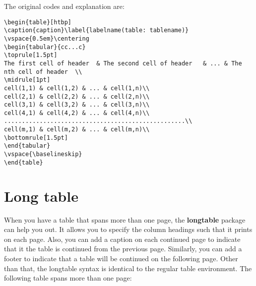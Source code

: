 The original codes and explanation are:

\begin{lstlisting}[language={[LaTex]Tex}]
\begin{table}[htbp]
\caption{caption}\label{labelname(table: tablename)}
\vspace{0.5em}\centering
\begin{tabular}{cc...c}
\toprule[1.5pt]
The first cell of header  & The second cell of header   & ... & The nth cell of header  \\
\midrule[1pt]
cell(1,1) & cell(1,2) & ... & cell(1,n)\\
cell(2,1) & cell(2,2) & ... & cell(2,n)\\
cell(3,1) & cell(3,2) & ... & cell(3,n)\\
cell(4,1) & cell(4,2) & ... & cell(4,n)\\
...................................................\\
cell(m,1) & cell(m,2) & ... & cell(m,n)\\
\bottomrule[1.5pt]
\end{tabular}
\vspace{\baselineskip}
\end{table}
\end{lstlisting}

\section{Long table}
When you have a table that spans more than one page, the \textbf{longtable} package can help you out. It allows you to specify the column headings such that it prints on each page. Also, you can add a caption on each continued page to indicate that it the table is continued from the previous page. Similarly, you can add a footer to indicate that a table will be continued on the following page. Other than that, the longtable syntax is identical to the regular table environment. The following table spans more than one page:

